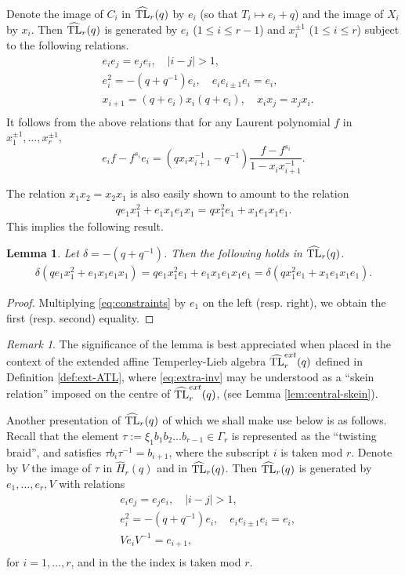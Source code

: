 \documentclass[12pt]{amsart}
\newtheorem{lemma}[theorem]{Lemma}
\theoremstyle{definition}
\theoremstyle{remark}
\newtheorem{remark}[theorem]{Remark}
\numberwithin{equation}{section}
\newcommand{\be}{\begin{equation}}
\newcommand{\ee}{\end{equation}}
\newcommand{\inv}{^{-1}}
\newcommand{\HH}{\widehat{H}}
\newcommand{\HTL}{\widehat{\rm TL}}
\begin{document}
Denote the image of $C_i$ in $\HTL_r(q)$ by $ e_i$ (so that $T_i\mapsto e_i+q$) and the image of $X_i$ by $x_i$.  
Then $\HTL_r(q)$ is generated by $e_i$ ($1\le i \le r-1$) and $x_i^{\pm 1}$ ($1\le i \le r$) 
subject to the following relations.
\be\label{eq:atlrel}
\begin{aligned}
&e_i e_j = e_j e_i, \quad |i-j|>1, \\
&e_i^2 = - (q+q^{-1}) e_i, \quad e_i e_{i\pm 1} e_i = e_i, \\
&x_{i+1} = (q+e_i) x_i (q+e_i), \quad x_i x_j =x_j x_i.\\
\end{aligned}
\ee
It follows from the above relations  that for any Laurent polynomial $f$ in $x^{\pm 1}_1, \dots, x^{\pm 1}_r$, 
\[
e_i f - f^{s_i} e_i = (qx_i x^{-1}_{i+1}-q^{-1}) \frac{f - f^{s_i}}{1-x_i x_{i+1}^{-1}}.
\]

The relation $x_1x_2=x_2x_1$ is also easily shown to amount to the relation 
\begin{eqnarray}\label{eq:constraints}
q e_1x_1^2+e_1x_1e_1x_1 =qx_1^2e_1+x_1e_1x_1e_1.  
\end{eqnarray}
This implies the following result. 
\begin{lemma}\label{lem:extra-inv}
Let  $\delta=-(q+q^{-1})$.  Then the following holds in $\HTL_r(q)$.
\begin{eqnarray}\label{eq:extra-inv}
\delta(q e_1x_1^2+e_1x_1e_1x_1) =q e_1 x_1^2e_1+ e_1 x_1e_1x_1e_1
= \delta(qx_1^2e_1+x_1e_1x_1e_1). 
\end{eqnarray}
\end{lemma}
\begin{proof}
Multiplying \eqref{eq:constraints} by $e_1$  on the left (resp. right), we obtain the first (resp. second) equality. 
\end{proof}

\begin{remark} The significance of the lemma is best appreciated when placed in the context of the extended 
affine Temperley-Lieb algebra $\HTL^{ext}_r(q)$ defined in Definition \ref{def:ext-ATL}, 
where \eqref{eq:extra-inv} may be understood as a ``skein relation'' imposed on the centre of $\HTL^{ext}_r(q)$, 
(see Lemma \ref{lem:central-skein}). 
\end{remark}

Another presentation of $\HTL_r(q)$ of which we shall make use below is as follows. 
Recall that the element $\tau:=\xi_1b_1b_2\dots b_{r-1}\in\Gamma_r$
is represented as the ``twisting braid'', and satisfies $\tau b_i\tau\inv=b_{i+1}$, where the subscript $i$ is taken mod $r$.
Denote by $V$ the image of $\tau$ in $\HH_r(q)$ and in $\HTL_r(q)$. Then $\HTL_r(q)$ is generated by 
$e_1,\dots,e_r,V$ with relations
\be\label{eq:atlrel2}
\begin{aligned}
&e_i e_j = e_j e_i, \quad |i-j|>1, \\
&e_i^2 = - (q+q^{-1}) e_i, \quad e_i e_{i\pm 1} e_i = e_i, \\
&Ve_iV\inv=e_{i+1},\\
\end{aligned}
\ee
for $i=1,\dots,r$, and in the the index is taken mod $r$. 
\end{document}
